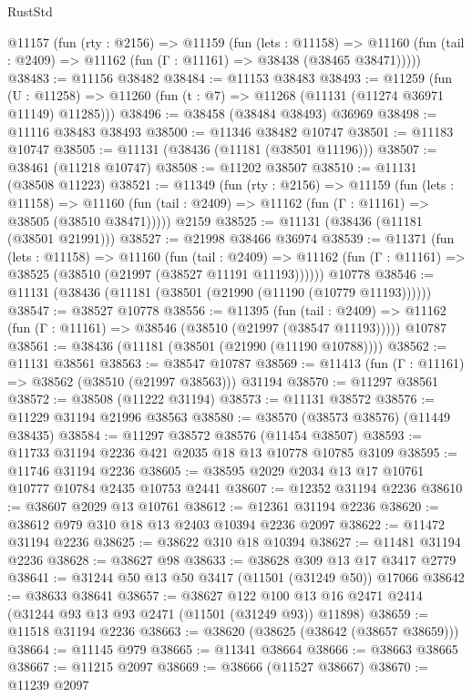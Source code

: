 \begin{lexlean}{RustStd}
\begin{coremodule}
  @11157
    (fun (rty : @2156) =>
    @11159
      (fun (lets : @11158) =>
      @11160 (fun (tail : @2409) => @11162 (fun (Γ : @11161) => @38438 (@38465 @38471)))))
@38483 := @11156 @38482
@38484 := @11153 @38483
@38493 := @11259
    (fun (U : @11258) => @11260 (fun (t : @7) => @11268 (@11131 (@11274 @36971 @11149) @11285)))
@38496 := @38458 (@38484 @38493) @36969
@38498 := @11116 @38483 @38493
@38500 := @11346 @38482 @10747
@38501 := @11183 @10747
@38505 := @11131 (@38436 (@11181 (@38501 @11196)))
@38507 := @38461 (@11218 @10747)
@38508 := @11202 @38507
@38510 := @11131 (@38508 @11223)
@38521 := @11349
    (fun (rty : @2156) =>
    @11159
      (fun (lets : @11158) =>
      @11160 (fun (tail : @2409) => @11162 (fun (Γ : @11161) => @38505 (@38510 @38471)))))
    @2159
@38525 := @11131 (@38436 (@11181 (@38501 @21991)))
@38527 := @21998 @38466 @36974
@38539 := @11371
    (fun (lets : @11158) =>
    @11160
      (fun (tail : @2409) =>
      @11162 (fun (Γ : @11161) => @38525 (@38510 (@21997 (@38527 @11191 @11193))))))
    @10778
@38546 := @11131 (@38436 (@11181 (@38501 (@21990 (@11190 (@10779 @11193))))))
@38547 := @38527 @10778
@38556 := @11395
    (fun (tail : @2409) => @11162 (fun (Γ : @11161) => @38546 (@38510 (@21997 (@38547 @11193)))))
    @10787
@38561 := @38436 (@11181 (@38501 (@21990 (@11190 @10788))))
@38562 := @11131 @38561
@38563 := @38547 @10787
@38569 := @11413 (fun (Γ : @11161) => @38562 (@38510 (@21997 @38563))) @31194
@38570 := @11297 @38561
@38572 := @38508 (@11222 @31194)
@38573 := @11131 @38572
@38576 := @11229 @31194 @21996 @38563
@38580 := @38570 (@38573 @38576) (@11449 @38435)
@38584 := @11297 @38572 @38576 (@11454 @38507)
@38593 := @11733 @31194 @2236 @421 @2035 @18 @13 @10778 @10785 @3109
@38595 := @11746 @31194 @2236
@38605 := @38595 @2029 @2034 @13 @17 @10761 @10777 @10784 @2435 @10753 @2441
@38607 := @12352 @31194 @2236
@38610 := @38607 @2029 @13 @10761
@38612 := @12361 @31194 @2236
@38620 := @38612 @979 @310 @18 @13 @2403 @10394 @2236 @2097
@38622 := @11472 @31194 @2236
@38625 := @38622 @310 @18 @10394
@38627 := @11481 @31194 @2236
@38628 := @38627 @98
@38633 := @38628 @309 @13 @17 @3417 @2779
@38641 := @31244 @50 @13 @50 @3417 (@11501 (@31249 @50)) @17066
@38642 := @38633 @38641
@38657 := @38627
    @122
    @100
    @13
    @16
    @2471
    @2414
    (@31244 @93 @13 @93 @2471 (@11501 (@31249 @93)) @11898)
@38659 := @11518 @31194 @2236
@38663 := @38620 (@38625 (@38642 (@38657 @38659)))
@38664 := @11145 @979
@38665 := @11341 @38664
@38666 := @38663 @38665
@38667 := @11215 @2097
@38669 := @38666 (@11527 @38667)
@38670 := @11239 @2097

\end{coremodule}
\end{lexlean}
